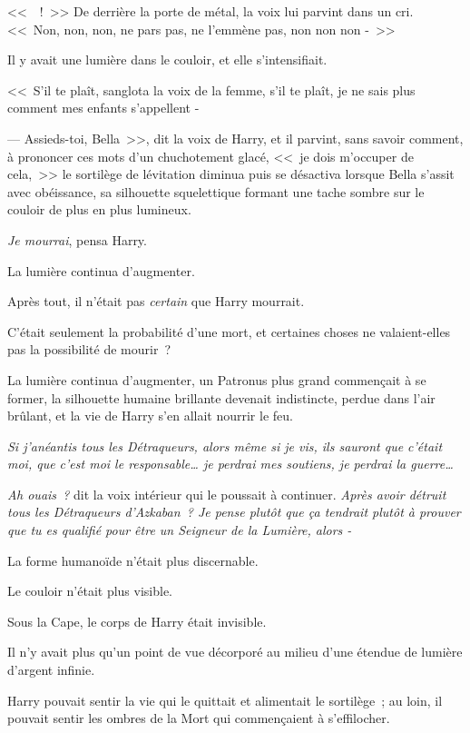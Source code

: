 <<~~!~>> De derrière la porte de métal, la voix lui parvint dans un cri. <<~Non, non, non, ne pars pas, ne l'emmène pas, non non non -~>>

Il y avait une lumière dans le couloir, et elle s'intensifiait.

<<~S'il te plaît, sanglota la voix de la femme, s'il te plaît, je ne sais plus comment mes enfants s'appellent -

--- Assieds-toi, Bella~>>, dit la voix de Harry, et il parvint, sans savoir comment, à prononcer ces mots d'un chuchotement glacé, <<~je dois m'occuper de cela,~>> le sortilège de lévitation diminua puis se désactiva lorsque Bella s'assit avec obéissance, sa silhouette squelettique formant une tache sombre sur le couloir de plus en plus lumineux.

\emph{Je mourrai}, pensa Harry.

La lumière continua d'augmenter.

Après tout, il n'était pas \emph{certain} que Harry mourrait.

C'était seulement la probabilité d'une mort, et certaines choses ne valaient-elles pas la possibilité de mourir~?

La lumière continua d'augmenter, un Patronus plus grand commençait à se former, la silhouette humaine brillante devenait indistincte, perdue dans l'air brûlant, et la vie de Harry s'en allait nourrir le feu.

\emph{Si j'anéantis tous les Détraqueurs, alors même si je vis, ils sauront que c'était moi, que c'est moi le responsable… je perdrai mes soutiens, je perdrai la guerre…}

\emph{Ah ouais~?} dit la voix intérieur qui le poussait à continuer. \emph{Après avoir détruit tous les Détraqueurs d'Azkaban~? Je pense plutôt que ça tendrait plutôt à prouver que tu es qualifié pour être un Seigneur de la Lumière, alors  -}

La forme humanoïde n'était plus discernable.

Le couloir n'était plus visible.

Sous la Cape, le corps de Harry était invisible.

Il n'y avait plus qu'un point de vue décorporé au milieu d'une étendue de lumière d'argent infinie.

Harry pouvait sentir la vie qui le quittait et alimentait le sortilège~; au loin, il pouvait sentir les ombres de la Mort qui commençaient à s'effilocher.


